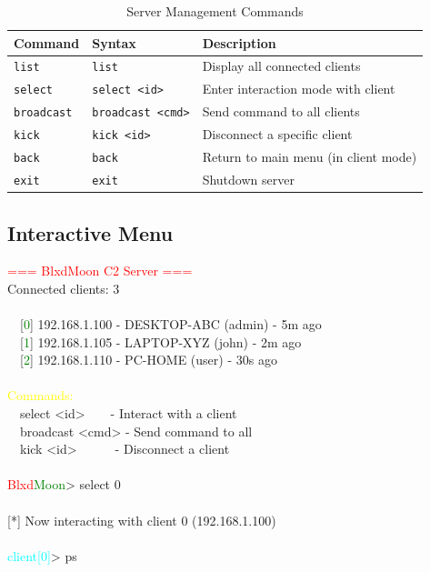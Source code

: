 \documentclass[12pt,a4paper]{article}
\begin{document}
\begin{table}[H]
\centering
\begin{tabular}{llp{6cm}}
\toprule
\textbf{Command} & \textbf{Syntax} & \textbf{Description} \\
\midrule
\texttt{list} & \texttt{list} & Display all connected clients \\
\texttt{select} & \texttt{select <id>} & Enter interaction mode with client \\
\texttt{broadcast} & \texttt{broadcast <cmd>} & Send command to all clients \\
\texttt{kick} & \texttt{kick <id>} & Disconnect a specific client \\
\texttt{back} & \texttt{back} & Return to main menu (in client mode) \\
\texttt{exit} & \texttt{exit} & Shutdown server \\
\bottomrule
\end{tabular}
\caption{Server Management Commands}
\end{table}

\subsection{Interactive Menu}

\begin{tcolorbox}[title=Server Interface Example, colback=black!90, coltext=green!70!white, coltitle=white, fontupper=\ttfamily\small]
\textcolor{red}{=== BlxdMoon C2 Server ===}\\
Connected clients: 3\\
\\
~~[\textcolor{green}{0}] 192.168.1.100 - DESKTOP-ABC (admin) - 5m ago\\
~~[\textcolor{green}{1}] 192.168.1.105 - LAPTOP-XYZ (john) - 2m ago\\
~~[\textcolor{green}{2}] 192.168.1.110 - PC-HOME (user) - 30s ago\\
\\
\textcolor{yellow}{Commands:}\\
~~select <id>~~~~- Interact with a client\\
~~broadcast <cmd> - Send command to all\\
~~kick <id>~~~~~~- Disconnect a client\\
\\
\textcolor{red}{Blxd}\textcolor{green}{Moon}> select 0\\
\\
{[}*{]} Now interacting with client 0 (192.168.1.100)\\
\\
\textcolor{cyan}{client[0]}> ps
\end{tcolorbox}
\end{document}
